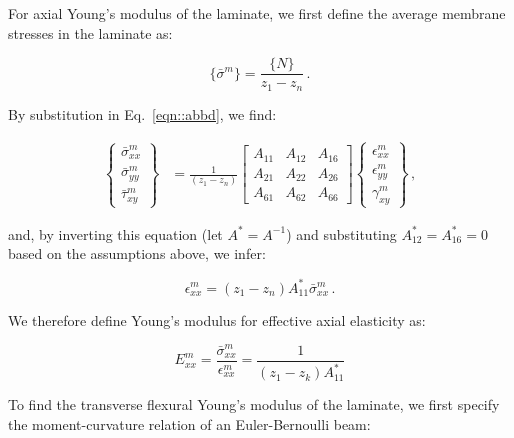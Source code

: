\documentclass[twocolumn, linenumbers, superscriptaddress, nofootinbib]{revtex4-1}
\begin{document}
				For axial Young's modulus of the laminate, we first define the average membrane stresses in the laminate as:
				
				\begin{equation}
					\{\bar{\sigma}^m\} = \frac{\{N\}}{z_1 - z_n}\,.
				\end{equation}
				
				By substitution in Eq.~\ref{eqn::abbd}, we find:
				
				\begin{equation}
					\begin{aligned}
						\begin{Bmatrix}
							\bar{\sigma}^m_{xx} \\
							\bar{\sigma}^m_{yy} \\
							\bar{\tau}^m_{xy}
						\end{Bmatrix}
						& = \frac{1}{(z_1 - z_n)}
						\begin{bmatrix}
							A_{11} & A_{12} & A_{16} \\
							A_{21} & A_{22} & A_{26} \\
							A_{61} & A_{62} & A_{66}
						\end{bmatrix}
						\begin{Bmatrix}
							\epsilon^m_{xx} \\
							\epsilon^m_{yy} \\
							\gamma^m_{xy}
						\end{Bmatrix}\,,
					\end{aligned}
				\end{equation}
				
				and, by inverting this equation (let $A^* = A^{-1}$) and substituting $A^*_{12} = A^*_{16} = 0$ based on the assumptions above, we infer:
				
				\begin{equation}
					\epsilon^m_{xx} = (z_1 - z_n)A^{*}_{11}\bar{\sigma}^m_{xx}\,.
				\end{equation}
				
				We therefore define Young's modulus for effective axial elasticity as:
				
				\begin{equation}
					E^m_{xx} = \frac{\bar{\sigma}^m_{xx}}{\epsilon^m_{xx}} = \frac{1}{(z_1 - z_k)A^*_{11}}
				\end{equation}
				
				To find the transverse flexural Young's modulus of the laminate, we first specify the moment-curvature relation of an Euler-Bernoulli beam:
				
\end{document}

